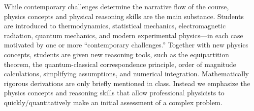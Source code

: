 \documentclass[english,aps,pra,reprint,noshowpacs,superscriptaddress]{revtex4-1}
\begin{document}
While contemporary challenges determine the narrative flow of the
course, physics concepts and physical reasoning skills are the main
substance. Students are introduced to thermodynamics, statistical
mechanics, electromagnetic radiation, quantum mechanics, and modern
experimental physics---in each case motivated by one or more
``contemporary challenges.'' Together with new physics concepts,
students are given new reasoning tools, such as the equipartition
theorem, the quantum-classical correspondence principle, order of
magnitude calculations, simplifying assumptions, and numerical
integration. Mathematically rigorous derivations are only briefly
mentioned in class. Instead we emphasize the physics concepts and reasoning
skills that allow professional physicists to quickly/quantitatively
make an initial assessment of a complex problem.



\end{document}
